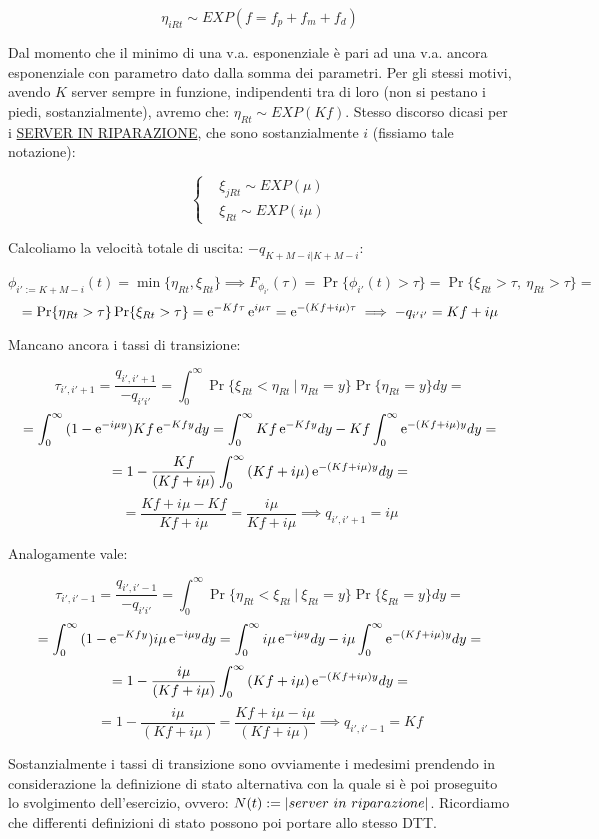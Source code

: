 \[
	\eta_{iRt}\sim EXP(f = f_p+f_m+f_d)
\]

Dal momento che il minimo di una v.a. esponenziale è pari ad una v.a. ancora esponenziale con parametro dato dalla somma dei parametri. Per gli stessi motivi, avendo $K$ server sempre in funzione, indipendenti tra di loro (non si pestano i piedi, sostanzialmente), avremo che: $\eta_{Rt}\sim EXP(Kf)$. Stesso discorso dicasi per i \underline{SERVER IN RIPARAZIONE}, che sono sostanzialmente $i$ (fissiamo tale notazione):

\[
	\left\{
	\begin{aligned}
	&\xi_{jRt}\sim EXP(\mu)\\
	&\xi_{Rt}\sim EXP(i\mu)
	\end{aligned}
	\right.
\]

Calcoliamo la velocità totale di uscita: $-q_{K+M-i|K+M-i}$:

\[
	\phi_{i':=K+M-i}(t) = \min\{\eta_{Rt},\xi_{Rt}\} \implies F_{\phi_{i'}}(\tau) = \Pr\{\phi_{i'}(t) > \tau\} = \Pr\{\xi_{Rt}>\tau,\ \eta_{Rt}>\tau\} = 
\]
\[
	= \Pr\{\eta_{Rt}>\tau\}\Pr\{\xi_{Rt}>\tau\} = \mathop{}\!\mathrm{e}^{-Kf\tau}\mathop{}\!\mathrm{e}^{i\mu\tau} = \mathop{}\!\mathrm{e}^{-(Kf+i\mu)\tau} \implies -q_{i'i'} = Kf+i\mu 
\]

Mancano ancora i tassi di transizione:

\[
	\tau_{i',i'+1} = \frac{q_{i',i'+1}}{-q_{i'i'}} = \int_0^\infty{\Pr\{\xi_{Rt} < \eta_{Rt}\ |\ \eta_{Rt}=y\}\Pr\{\eta_{Rt}=y\}dy} =
\]
\[
	= \int_0^\infty{(1-\mathop{}\!\mathrm{e}^{-i\mu y})Kf\mathop{}\!\mathrm{e}^{-Kf y}dy} = \int_0^\infty{Kf\mathop{}\!\mathrm{e}^{-Kfy}dy} - Kf\int_0^\infty{\mathop{}\!\mathrm{e}^{-(Kf+i\mu)y}dy} =
\]
\[
	= 1-\frac{Kf}{(Kf+i\mu)}\int_0^\infty{(Kf+i\mu)\mathop{}\!\mathrm{e}^{-(Kf+i\mu)y}dy} =
\]
\[
	= \frac{Kf+i\mu-Kf}{Kf+i\mu} = \frac{i\mu}{Kf+i\mu} \implies q_{i',i'+1} = i\mu 
\]

Analogamente vale:

\[
	\tau_{i',i'-1} = \frac{q_{i',i'-1}}{-q_{i'i'}} = \int_0^\infty{\Pr\{\eta_{Rt} < \xi_{Rt}\ |\ \xi_{Rt}=y\}\Pr\{\xi_{Rt}=y\}dy} =
\]
\[
	= \int_0^\infty{(1-\mathop{}\!\mathrm{e}^{-Kfy})i\mu\mathop{}\!\mathrm{e}^{-i\mu y}dy} = \int_0^\infty{i\mu\mathop{}\!\mathrm{e}^{-i\mu y}dy} -i\mu\int_0^\infty{\mathop{}\!\mathrm{e}^{-(Kf+i\mu)y}dy} =
\]
\[
	= 1-\frac{i\mu}{(Kf+i\mu)}\int_0^\infty{(Kf+i\mu)\mathop{}\!\mathrm{e}^{-(Kf+i\mu)y}dy} =
\]
\[
	= 1-\frac{i\mu}{(Kf+i\mu)} = \frac{Kf+i\mu-i\mu}{(Kf+i\mu)} \implies q_{i',i'-1}=Kf
\]

Sostanzialmente i tassi di transizione sono ovviamente i medesimi prendendo in considerazione la definizione di stato alternativa con la quale si è poi proseguito lo svolgimento dell'esercizio, ovvero: $N(t):=\cardinality{server\ in\ riparazione}$. Ricordiamo che differenti definizioni di stato possono poi portare allo stesso DTT.


